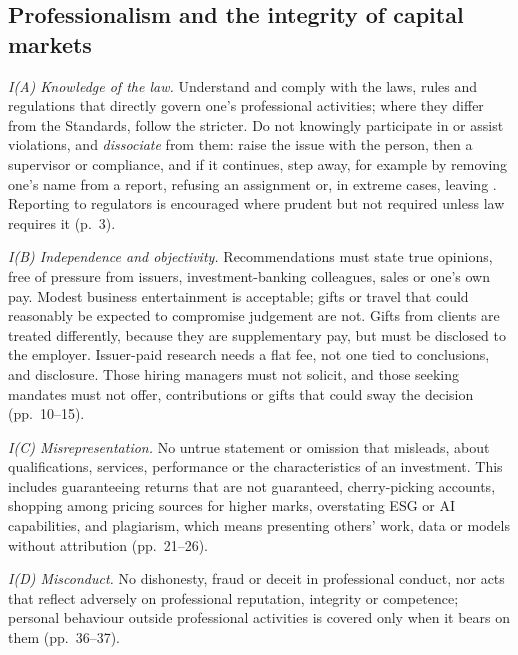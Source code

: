 \subsection{Professionalism and the integrity of capital markets}

\begin{qfrule}\label{rule:standard-professionalism}
 \emph{I(A) Knowledge of the law.} Understand and comply with the laws, rules and regulations that directly govern one's professional activities; where they differ from the Standards, follow the stricter. Do not knowingly participate in or assist violations, and \emph{dissociate} from them: raise the issue with the person, then a supervisor or compliance, and if it continues, step away, for example by removing one's name from a report, refusing an assignment or, in extreme cases, leaving \citep[pp.~1--6]{standards-practice-handbook-2024}. Reporting to regulators is encouraged where prudent but not required unless law requires it (p.~3).

\emph{I(B) Independence and objectivity.} Recommendations must state true opinions, free of pressure from issuers, investment-banking colleagues, sales or one's own pay. Modest business entertainment is acceptable; gifts or travel that could reasonably be expected to compromise judgement are not. Gifts from clients are treated differently, because they are supplementary pay, but must be disclosed to the employer. Issuer-paid research needs a flat fee, not one tied to conclusions, and disclosure. Those hiring managers must not solicit, and those seeking mandates must not offer, contributions or gifts that could sway the decision (pp.~10--15).

\emph{I(C) Misrepresentation.} No untrue statement or omission that misleads, about qualifications, services, performance or the characteristics of an investment. This includes guaranteeing returns that are not guaranteed, cherry-picking accounts, shopping among pricing sources for higher marks, overstating ESG or AI capabilities, and plagiarism, which means presenting others' work, data or models without attribution (pp.~21--26).

\emph{I(D) Misconduct.} No dishonesty, fraud or deceit in professional conduct, nor acts that reflect adversely on professional reputation, integrity or competence; personal behaviour outside professional activities is covered only when it bears on them (pp.~36--37).


\end{qfrule}
